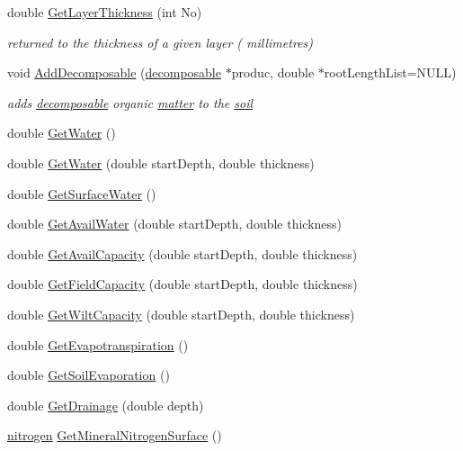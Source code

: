 \begin{DoxyCompactItemize}
double \hyperlink{classsoil_a2036fe29081a982325d1c6b8b644db12}{GetLayerThickness} (int No)
\begin{DoxyCompactList}\small\item\em returned to the thickness of a given layer ( millimetres) \item\end{DoxyCompactList}\item 
void \hyperlink{classsoil_a6ddfca2c474855d16889d6a85c4b508e}{AddDecomposable} (\hyperlink{classdecomposable}{decomposable} $\ast$produc, double $\ast$rootLengthList=NULL)
\begin{DoxyCompactList}\small\item\em adds \hyperlink{classdecomposable}{decomposable} organic \hyperlink{classmatter}{matter} to the \hyperlink{classsoil}{soil} \item\end{DoxyCompactList}\item 
double \hyperlink{classsoil_ae41f4677e15e604b208276eceb2e2369}{GetWater} ()
\item 
double \hyperlink{classsoil_a52d6ffa254fce1398d47c427d572efe1}{GetWater} (double startDepth, double thickness)
\item 
double \hyperlink{classsoil_a5b84e06a756061c8bb3c71ddb800929a}{GetSurfaceWater} ()
\item 
double \hyperlink{classsoil_a42157cb55748341f87032731541d5f4f}{GetAvailWater} (double startDepth, double thickness)
\item 
double \hyperlink{classsoil_ab8f4f06f1f806065b589815bedd8d5b9}{GetAvailCapacity} (double startDepth, double thickness)
\item 
double \hyperlink{classsoil_a7393e26e3493fc1af1304fc59f3a73d0}{GetFieldCapacity} (double startDepth, double thickness)
\item 
double \hyperlink{classsoil_a06c73f2cfdba2d776e2ac58ba8894c0b}{GetWiltCapacity} (double startDepth, double thickness)
\item 
double \hyperlink{classsoil_a126d3562bbb76b6055c141d2227ddde7}{GetEvapotranspiration} ()
\item 
double \hyperlink{classsoil_ae625960b7cd65dc6aba73d4e8634f84b}{GetSoilEvaporation} ()
\item 
double \hyperlink{classsoil_ab114def0736881d1d3ff39454ff70e67}{GetDrainage} (double depth)
\item 
\hyperlink{classnitrogen}{nitrogen} \hyperlink{classsoil_a21acd42a58c98c55e60216b0662d4ecf}{GetMineralNitrogenSurface} ()
\item 

\end{DoxyCompactItemize}
